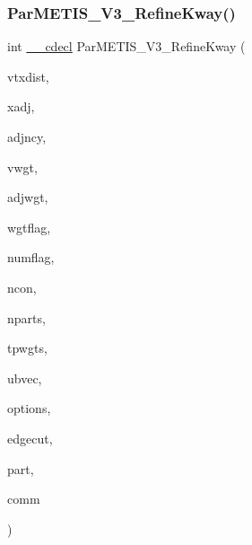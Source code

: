 \subsubsection{\texorpdfstring{Par\+M\+E\+T\+I\+S\+\_\+\+V3\+\_\+\+Refine\+Kway()}{ParMETIS\_V3\_RefineKway()}}
{\footnotesize\ttfamily int \hyperlink{include_2parmetis_8h_a238347d7669f8f1e9c83bfe63a2730c4}{\+\_\+\+\_\+cdecl} Par\+M\+E\+T\+I\+S\+\_\+\+V3\+\_\+\+Refine\+Kway (\begin{DoxyParamCaption}\item[{\hyperlink{3rd_party_2parmetis-4_80_83_2metis_2include_2metis_8h_aaa5262be3e700770163401acb0150f52}{idx\+\_\+t} $\ast$}]{vtxdist,  }\item[{\hyperlink{3rd_party_2parmetis-4_80_83_2metis_2include_2metis_8h_aaa5262be3e700770163401acb0150f52}{idx\+\_\+t} $\ast$}]{xadj,  }\item[{\hyperlink{3rd_party_2parmetis-4_80_83_2metis_2include_2metis_8h_aaa5262be3e700770163401acb0150f52}{idx\+\_\+t} $\ast$}]{adjncy,  }\item[{\hyperlink{3rd_party_2parmetis-4_80_83_2metis_2include_2metis_8h_aaa5262be3e700770163401acb0150f52}{idx\+\_\+t} $\ast$}]{vwgt,  }\item[{\hyperlink{3rd_party_2parmetis-4_80_83_2metis_2include_2metis_8h_aaa5262be3e700770163401acb0150f52}{idx\+\_\+t} $\ast$}]{adjwgt,  }\item[{\hyperlink{3rd_party_2parmetis-4_80_83_2metis_2include_2metis_8h_aaa5262be3e700770163401acb0150f52}{idx\+\_\+t} $\ast$}]{wgtflag,  }\item[{\hyperlink{3rd_party_2parmetis-4_80_83_2metis_2include_2metis_8h_aaa5262be3e700770163401acb0150f52}{idx\+\_\+t} $\ast$}]{numflag,  }\item[{\hyperlink{3rd_party_2parmetis-4_80_83_2metis_2include_2metis_8h_aaa5262be3e700770163401acb0150f52}{idx\+\_\+t} $\ast$}]{ncon,  }\item[{\hyperlink{3rd_party_2parmetis-4_80_83_2metis_2include_2metis_8h_aaa5262be3e700770163401acb0150f52}{idx\+\_\+t} $\ast$}]{nparts,  }\item[{\hyperlink{3rd_party_2parmetis-4_80_83_2metis_2include_2metis_8h_a1924a4f6907cc3833213aba1f07fcbe9}{real\+\_\+t} $\ast$}]{tpwgts,  }\item[{\hyperlink{3rd_party_2parmetis-4_80_83_2metis_2include_2metis_8h_a1924a4f6907cc3833213aba1f07fcbe9}{real\+\_\+t} $\ast$}]{ubvec,  }\item[{\hyperlink{3rd_party_2parmetis-4_80_83_2metis_2include_2metis_8h_aaa5262be3e700770163401acb0150f52}{idx\+\_\+t} $\ast$}]{options,  }\item[{\hyperlink{3rd_party_2parmetis-4_80_83_2metis_2include_2metis_8h_aaa5262be3e700770163401acb0150f52}{idx\+\_\+t} $\ast$}]{edgecut,  }\item[{\hyperlink{3rd_party_2parmetis-4_80_83_2metis_2include_2metis_8h_aaa5262be3e700770163401acb0150f52}{idx\+\_\+t} $\ast$}]{part,  }\item[{M\+P\+I\+\_\+\+Comm $\ast$}]{comm }\end{DoxyParamCaption})}

